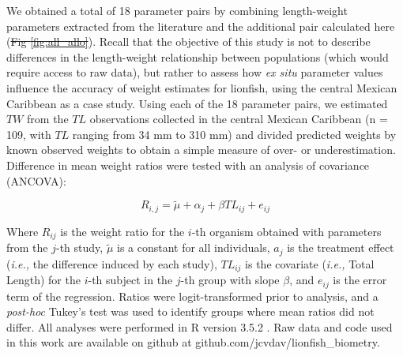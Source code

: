 \documentclass[fleqn,10pt,lineno]{wlpeerj} %
\providecommand{\DIFadd}[1]{{\protect\color{blue}\uwave{#1}}} %
\providecommand{\DIFdel}[1]{{\protect\color{red}\sout{#1}}}                      %
\providecommand{\DIFaddbegin}{} %
\providecommand{\DIFaddend}{} %
\providecommand{\DIFdelbegin}{} %
\providecommand{\DIFdelend}{} %
\begin{document}
We obtained a total of 18 parameter pairs by combining length-weight
parameters extracted from the literature and the additional pair
calculated here (\DIFdelbegin \DIFdel{Fig \ref{fig:all_allo}}\DIFdelend \DIFaddbegin \DIFadd{Table \ref{tab:all_params}}\DIFaddend ). Recall that the objective of
this study is not to describe differences in the length-weight
relationship between populations (which would require access to raw
data), but rather to assess how \emph{ex situ} parameter values
influence the accuracy of weight estimates for lionfish, using the
central Mexican Caribbean as a case study. Using each of the 18
parameter pairs, we estimated \(TW\) from the \(TL\) observations
collected in the central Mexican Caribbean (n = 109, with \(TL\) ranging
from 34 mm to 310 mm) and divided predicted weights by known observed
weights to obtain a simple measure of over- or underestimation.
Difference in mean weight ratios were tested with an analysis of
covariance (ANCOVA):

\begin{equation}
R_{i,j} = \tilde{\mu} + \alpha_j + \beta TL_{ij} + e_{ij}
\end{equation}

\clearpage

Where \(R_{ij}\) is the weight ratio for the \(i\)-th organism obtained
with parameters from the \(j\)-th study, \(\tilde{\mu}\) is a constant
for all individuals, \(a_j\) is the treatment effect (\emph{i.e.,} the
difference induced by each study), \(TL_{ij}\) is the covariate
(\emph{i.e.,} Total Length) for the \(i\)-th subject in the \(j\)-th
group with slope \(\beta\), and \(e_{ij}\) is the error term of the
regression. Ratios were logit-transformed prior to analysis, and a
\emph{post-hoc} Tukey's test was used to identify groups where mean
ratios did not differ. All analyses were performed in R version 3.5.2
\citep{rcore_2018}. Raw data and code used in this work are available on
github at github.com/jcvdav/lionfish\_biometry.
\end{document}
